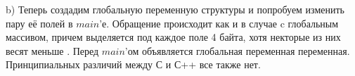 \documentclass[a4paper,12pt]{article}
\begin{document}
b) Теперь создадим глобальную переменную структуры и попробуем изменить пару её полей в $main$'е. Обращение происходит как и в случае c глобальным массивом, причем выделяется под каждое поле 4 байта, хотя некторые из них весят меньше . Перед $main$'ом объявляется глобальная переменная переменная. Принципиальных различий между С и С++ все также нет.
\begin{figure}[H]\label{fig: 3бCpp32 and 3бCpp64}
\end{figure}
\end{document}
